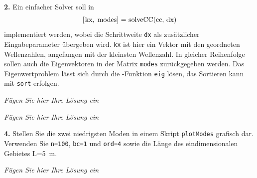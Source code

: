 \documentclass[Protokollheft.tex]{subfiles}
\begin{document}
        \begin{framed}
	\noindent \textbf{2.} Ein einfacher Solver soll in
                    \begin{align}
                        \lstinline{[kx, modes] = solveCC(cc, dx)} \label{meth:solveCC}
                    \end{align}
                    implementiert werden, wobei die Schrittweite \lstinline{dx} als zusätzlicher Eingabeparameter übergeben wird.
                    \lstinline{kx} ist hier ein Vektor mit den geordneten Wellenzahlen, angefangen mit der kleinsten Wellenzahl. In gleicher
                    Reihenfolge sollen auch die Eigenvektoren in der Matrix \lstinline{modes} zurückgegeben werden.
                    Das Eigenwertproblem lässt sich durch die \matlab-Funktion \lstinline{eig} lösen, das Sortieren kann mit \lstinline{sort} erfolgen.\label{exer:solveCC}
\end{framed}

\emph{Fügen Sie hier Ihre Lösung ein}


\emph{Fügen Sie hier Ihre Lösung ein}

        \begin{framed}
	\noindent \textbf{4.} Stellen Sie die zwei niedrigsten Moden in einem Skript \lstinline{plotModes} grafisch dar.
        Verwenden Sie \lstinline{n=100}, \lstinline{bc=1} und \lstinline{ord=4} sowie die Länge des eindimensionalen Gebietes L=\SI{5}{m}.\label{exer:plotModes}
\end{framed}

\emph{Fügen Sie hier Ihre Lösung ein}
\end{document}
